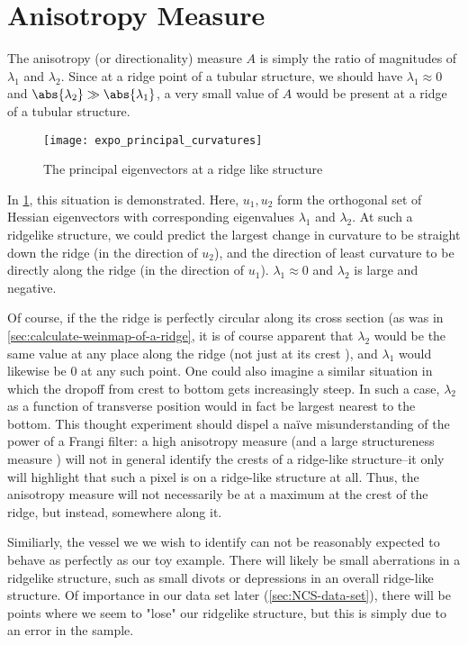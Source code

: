 \section{Anisotropy Measure} \label{sec:frangi.anisotropy}
The anisotropy (or directionality) measure $A$ is simply the ratio of magnitudes of $\lambda_1$ and $\lambda_2$. Since at a ridge point of a tubular structure, we should have $\lambda_1 \approx 0$ and $\abs{\lambda_2} \gg \abs{\lambda_1}$,
a very small value of $A$ would be present at a ridge of a tubular structure.

\begin{figure} \centering
  \texttt{[image: expo\_principal\_curvatures]}
  \caption{The principal eigenvectors at a ridge like structure} 
  \label{fig:expo-principal-curvatures}
\end{figure}

In \cref{fig:expo-principal-curvatures}, this situation is demonstrated. Here, $u_1, u_2$ form the orthogonal set of Hessian eigenvectors with corresponding eigenvalues $\lambda_1$ and $\lambda_2$. At such a ridgelike structure, we could predict the largest change in curvature to be straight down the ridge (in the direction of $u_2$), and the direction of least curvature to be directly along the ridge (in the direction  of $u_1$). $\lambda_1 \approx 0$ and $\lambda_2$ is large and negative.

Of course, if the the ridge is perfectly circular along its cross section (as was in \cref{sec:calculate-weinmap-of-a-ridge}, it is of course apparent that $\lambda_2$ would be the same value at any place along the ridge (not just at its crest ), and $\lambda_1$ would likewise be 0 at any such point.  One could also imagine a similar situation in which the dropoff from crest to bottom gets increasingly steep. In such a case, $\lambda_2$ as a function of transverse position would in fact be largest nearest to the bottom. This thought experiment should dispel a na\"{i}ve misunderstanding of the power of a Frangi filter: a high anisotropy measure (and a large structureness measure ) will not in general identify the crests of a ridge-like structure--it only will highlight that such a pixel is on a ridge-like structure at all. Thus, the anisotropy measure will not necessarily be at a maximum at the crest of the ridge, but instead, somewhere along it.

Similiarly, the vessel we we wish to identify can not be reasonably expected to behave as perfectly as our toy example. There will likely be small aberrations in a ridgelike structure, such as small divots or depressions in an overall ridge-like structure. Of importance in our data set later (\cref{sec:NCS-data-set}), there will be points where we seem to "lose" our ridgelike structure,
but this is simply due to an error in the sample.

